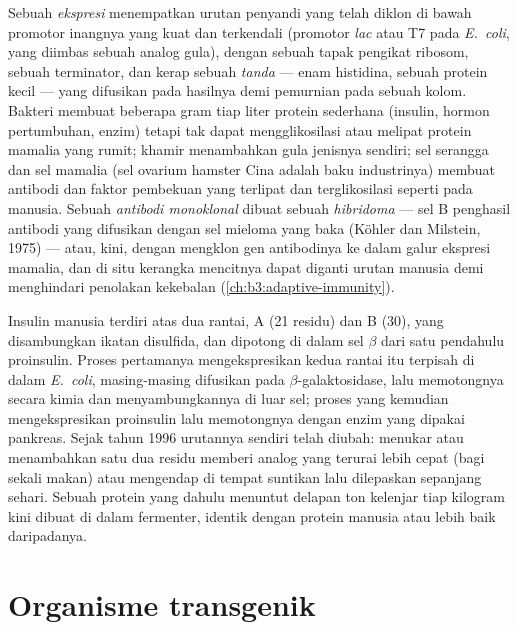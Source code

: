 \begin{definition}\label{def:b3:genetic-engineering:expression}
Sebuah \emph{ ekspresi} menempatkan urutan penyandi yang telah diklon di
bawah promotor inangnya yang kuat dan terkendali (promotor \emph{lac} atau T7
pada \emph{E.~coli}, yang diimbas sebuah analog gula), dengan sebuah tapak
pengikat ribosom, sebuah terminator, dan kerap sebuah \emph{tanda} --- enam
histidina, sebuah protein kecil --- yang difusikan pada hasilnya demi
pemurnian pada sebuah kolom. Bakteri membuat beberapa gram tiap liter protein
sederhana (insulin, hormon pertumbuhan, enzim) tetapi tak dapat
mengglikosilasi atau melipat protein mamalia yang rumit; khamir menambahkan
gula jenisnya sendiri; sel serangga dan sel mamalia (sel ovarium hamster Cina
adalah baku industrinya) membuat antibodi dan faktor pembekuan yang terlipat
dan terglikosilasi seperti pada manusia. Sebuah \emph{antibodi monoklonal}
dibuat sebuah \emph{hibridoma} --- sel B penghasil antibodi yang difusikan
dengan sel mieloma yang baka (Köhler dan Milstein, 1975) --- atau, kini, dengan
mengklon gen antibodinya ke dalam galur ekspresi mamalia, dan di situ kerangka
mencitnya dapat diganti urutan manusia demi menghindari penolakan kekebalan
(\cref{ch:b3:adaptive-immunity}).
\end{definition}

\begin{example}[Insulin]\label{ex:b3:genetic-engineering:insulin}
Insulin manusia terdiri atas dua rantai, A (21 residu) dan B (30), yang
disambungkan ikatan disulfida, dan dipotong di dalam sel $\beta$ dari satu
pendahulu proinsulin. Proses pertamanya mengekspresikan kedua rantai itu
terpisah di dalam \emph{E.~coli}, masing-masing difusikan pada
$\beta$-galaktosidase, lalu memotongnya secara kimia dan menyambungkannya di
luar sel; proses yang kemudian mengekspresikan proinsulin lalu memotongnya
dengan enzim yang dipakai pankreas. Sejak tahun 1996 urutannya sendiri telah
diubah: menukar atau menambahkan satu dua residu memberi analog yang terurai
lebih cepat (bagi sekali makan) atau mengendap di tempat suntikan lalu
dilepaskan sepanjang sehari. Sebuah protein yang dahulu menuntut delapan ton
kelenjar tiap kilogram kini dibuat di dalam fermenter, identik dengan protein
manusia atau lebih baik daripadanya.
\end{example}

\section{Organisme transgenik}

